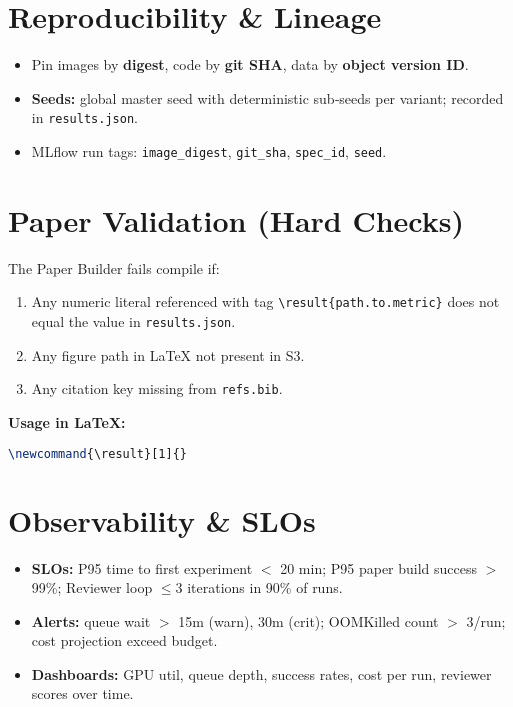 \section{Reproducibility \& Lineage}
\begin{itemize}[leftmargin=1.4em]
\item Pin images by \textbf{digest}, code by \textbf{git SHA}, data by \textbf{object version ID}.
\item \textbf{Seeds:} global master seed with deterministic sub‑seeds per variant; recorded in \texttt{results.json}.
\item MLflow run tags: \texttt{image\_digest}, \texttt{git\_sha}, \texttt{spec\_id}, \texttt{seed}.
\end{itemize}

\section{Paper Validation (Hard Checks)}
The Paper Builder fails compile if:
\begin{enumerate}[leftmargin=1.4em]
\item Any numeric literal referenced with tag \verb|\result{path.to.metric}| does not equal the value in \texttt{results.json}.
\item Any figure path in LaTeX not present in S3.
\item Any citation key missing from \texttt{refs.bib}.
\end{enumerate}

\noindent\textbf{Usage in LaTeX:}
\begin{lstlisting}[style=code,language=TeX,caption={Numeric reference macro}]
% \result{variants.self_consistency_k10.rmse} -> 0.191
\newcommand{\result}[1]{}
\end{lstlisting}

\section{Observability \& SLOs}
\begin{itemize}[leftmargin=1.4em]
\item \textbf{SLOs:} P95 time to first experiment $<$ 20 min; P95 paper build success $>$ 99\%; Reviewer loop $\leq 3$ iterations in 90\% of runs.
\item \textbf{Alerts:} queue wait $>$ 15m (warn), 30m (crit); OOMKilled count $>$ 3/run; cost projection exceed budget.
\item \textbf{Dashboards:} GPU util, queue depth, success rates, cost per run, reviewer scores over time.
\end{itemize}

